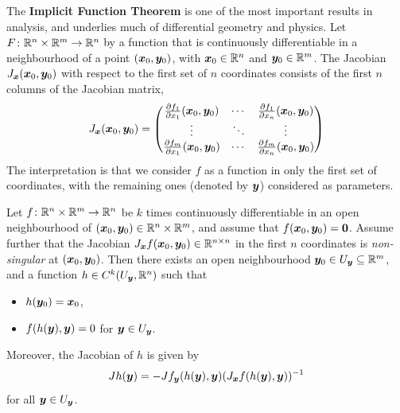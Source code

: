 The \textbf{Implicit Function Theorem} is one of the most important results in analysis, and underlies much of differential geometry and physics. 
Let $F\colon \mathbb{R}^{n}\times \mathbb{R}^{m}\to \mathbb{R}^n$ by a function that is continuously differentiable in a neighbourhood of a point $(\bm{x}_0,\bm{y}_0)$, with $\bm{x}_0\in \mathbb{R}^n$ and $\bm{y}_0\in \mathbb{R}^m$. The Jacobian $J_{\bm{x}}(\bm{x}_0,\bm{y}_0)$ with respect to the first set of $n$ coordinates consists of the first $n$ columns of the Jacobian matrix,
\begin{equation*}
 J_{\bm{x}}(\bm{x}_0,\bm{y}_0) = \begin{pmatrix}
                                     \frac{\partial f_1}{\partial x_1}(\bm{x}_0,\bm{y}_0) & \cdots & \frac{\partial f_1}{\partial x_n}(\bm{x}_0,\bm{y}_0)\\
                                     \vdots & \ddots & \vdots\\
                                     \frac{\partial f_m}{\partial x_1}(\bm{x}_0,\bm{y}_0) & \cdots & \frac{\partial f_m}{\partial x_n}(\bm{x}_0,\bm{y}_0)
                                    \end{pmatrix}
\end{equation*}
The interpretation is that we consider $f$ as a function in only the first set of coordinates, with the remaining ones (denoted by $\bm{y}$) considered as parameters.

\begin{theorem*}
Let $f\colon \mathbb{R}^n\times \mathbb{R}^m\to \mathbb{R}^n$ be $k$ times continuously differentiable in an open neighbourhood of $(\bm{x}_0,\bm{y}_0)\in \mathbb{R}^{n}\times \mathbb{R}^m$, and assume that $f(\bm{x}_0,\bm{y}_0) = \bm{0}$. Assume further 
that the Jacobian $J_{\bm{x}}f(\bm{x}_0,\bm{y}_0)\in \mathbb{R}^{n\times n}$ in the first $n$ coordinates is {\em non-singular} at $(\bm{x}_0,\bm{y}_0)$. Then there exists an open neighbourhood $\bm{y}_0\in U_{\bm{y}}\subseteq \mathbb{R}^m$, and a function $h\in C^k(U_{\bm{y}},\mathbb{R}^n)$ such that 
\begin{itemize}
 \item $h(\bm{y}_0) = \bm{x}_0$,
\item $f(h(\bm{y}),\bm{y})=0$ for $\bm{y}\in U_{\bm{y}}$.
\end{itemize}
Moreover, the Jacobian of $h$ is given by
\begin{equation*}
 Jh(\bm{y}) = -Jf_{\bm{y}}(h(\bm{y}),\bm{y}) (J_{\bm{x}}f(h(\bm{y}),\bm{y}))^{-1}
\end{equation*}
for all $\bm{y}\in U_{\bm{y}}$.
\end{theorem*}

